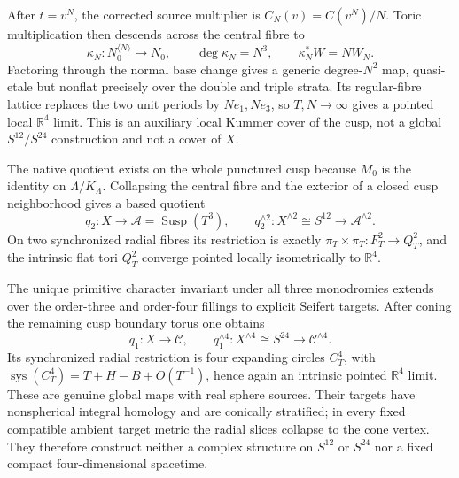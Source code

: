 {\ResultSmall
After \(t=v^N\), the corrected source multiplier is
\(C_N(v)=C(v^N)/N\).  Toric multiplication then descends across the central
fibre to
\[
 \kappa_N:N_0^{\langle N\rangle}\longrightarrow N_0,\qquad
 \deg\kappa_N=N^3,\qquad \kappa_N^*W=NW_N.
\]
Factoring through the normal base change gives a generic degree-\(N^2\)
map, quasi-etale but nonflat precisely over the double and triple strata.
Its regular-fibre lattice replaces the two unit periods by
\(Ne_1,Ne_3\), so \(T,N\to\infty\) gives a pointed local
\(\mathbb R^4\) limit.  This is an auxiliary local Kummer cover of the cusp,
not a global \(S^{12}/S^{24}\) construction and not a cover of \(X\).
}

{\ResultSmall
The native quotient exists on the whole punctured cusp because \(M_0\) is
the identity on \(\Lambda/K_\Lambda\).  Collapsing the central fibre and the
exterior of a closed cusp neighborhood gives a based quotient
\[
 q_2:X\longrightarrow\mathcal A=\operatorname{Susp}(T^3),\qquad
 q_2^{\wedge2}:X^{\wedge2}\cong S^{12}
 \longrightarrow\mathcal A^{\wedge2}.
\]
On two synchronized radial fibres its restriction is exactly
\(\pi_T\times\pi_T:F_T^2\to Q_T^2\), and the intrinsic flat tori
\(Q_T^2\) converge pointed locally isometrically to \(\mathbb R^4\).

The unique primitive character invariant under all three monodromies extends
over the order-three and order-four fillings to explicit Seifert targets.
After coning the remaining cusp boundary torus one obtains
\[
 q_1:X\longrightarrow\mathcal C,\qquad
 q_1^{\wedge4}:X^{\wedge4}\cong S^{24}
 \longrightarrow\mathcal C^{\wedge4}.
\]
Its synchronized radial restriction is four expanding circles
\(C_T^4\), with
\(\operatorname{sys}(C_T^4)=T+H-B+O(T^{-1})\), hence again an intrinsic
pointed \(\mathbb R^4\) limit.  These are genuine global maps with real
sphere sources.  Their targets have nonspherical integral homology and are
conically stratified; in every fixed compatible ambient target metric the
radial slices collapse to the cone vertex.  They therefore construct neither
a complex structure on \(S^{12}\) or \(S^{24}\) nor a fixed compact
four-dimensional spacetime.
}

